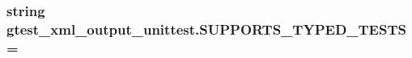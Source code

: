 \subsubsection[{S\+U\+P\+P\+O\+R\+T\+S\+\_\+\+T\+Y\+P\+E\+D\+\_\+\+T\+E\+S\+T\+S}]{\setlength{\rightskip}{0pt plus 5cm}string gtest\+\_\+xml\+\_\+output\+\_\+unittest.\+S\+U\+P\+P\+O\+R\+T\+S\+\_\+\+T\+Y\+P\+E\+D\+\_\+\+T\+E\+S\+T\+S = \textquotesingle{}}\label{namespacegtest__xml__output__unittest_a07eecd027d660022c0ab447f3c3e0f2e}
